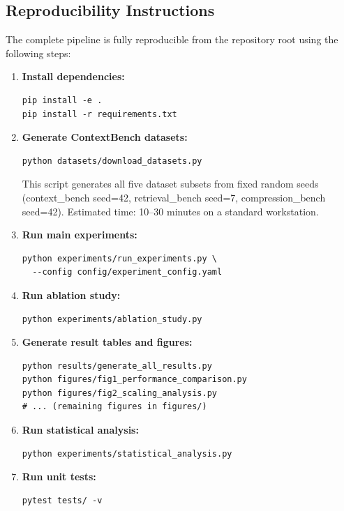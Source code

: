 \subsection{Reproducibility Instructions}

The complete pipeline is fully reproducible from the repository root using the
following steps:

\begin{enumerate}
  \item \textbf{Install dependencies:}
\begin{verbatim}
pip install -e .
pip install -r requirements.txt
\end{verbatim}

  \item \textbf{Generate ContextBench datasets:}
\begin{verbatim}
python datasets/download_datasets.py
\end{verbatim}
  This script generates all five dataset subsets from fixed random seeds
  (context\_bench seed=42, retrieval\_bench seed=7, compression\_bench seed=42).
  Estimated time: 10--30 minutes on a standard workstation.

  \item \textbf{Run main experiments:}
\begin{verbatim}
python experiments/run_experiments.py \
  --config config/experiment_config.yaml
\end{verbatim}

  \item \textbf{Run ablation study:}
\begin{verbatim}
python experiments/ablation_study.py
\end{verbatim}

  \item \textbf{Generate result tables and figures:}
\begin{verbatim}
python results/generate_all_results.py
python figures/fig1_performance_comparison.py
python figures/fig2_scaling_analysis.py
# ... (remaining figures in figures/)
\end{verbatim}

  \item \textbf{Run statistical analysis:}
\begin{verbatim}
python experiments/statistical_analysis.py
\end{verbatim}

  \item \textbf{Run unit tests:}
\begin{verbatim}
pytest tests/ -v
\end{verbatim}
\end{enumerate}


